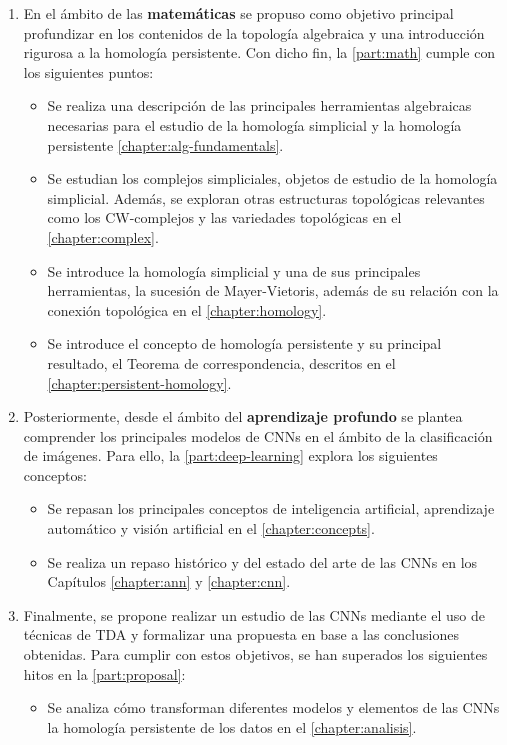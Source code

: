 \begin{enumerate}
	\item En el ámbito de las \textbf{matemáticas} se propuso como objetivo
	principal profundizar en los contenidos de la topología algebraica y una
	introducción rigurosa a la homología persistente. Con dicho fin, la
	\autoref{part:math} cumple con los siguientes puntos:
	\begin{itemize}
		\item Se realiza una descripción de las principales herramientas algebraicas
		necesarias para el estudio de la homología simplicial y la homología persistente
		\autoref{chapter:alg-fundamentals}.
		
		\item Se estudian los complejos simpliciales, objetos de estudio de la
		homología simplicial. Además, se exploran otras estructuras topológicas
		relevantes como los CW-complejos y las variedades topológicas en el
		\autoref{chapter:complex}.
		
		\item Se introduce la homología simplicial y una de sus principales herramientas,
		la sucesión de Mayer-Vietoris, además de su relación con la conexión topológica
		en el \autoref{chapter:homology}.
		
		\item Se introduce el concepto de homología persistente y su principal resultado,
		el Teorema de correspondencia, descritos en el \autoref{chapter:persistent-homology}.
	\end{itemize}
	
	\item Posteriormente, desde el ámbito del \textbf{aprendizaje profundo} se plantea
	comprender los principales modelos de CNNs en el ámbito de la clasificación de
	imágenes. Para ello, la \autoref{part:deep-learning} explora los siguientes conceptos:
	\begin{itemize}
		\item Se repasan los principales conceptos de inteligencia artificial,
		aprendizaje automático y visión artificial en el
		\autoref{chapter:concepts}.
		
		\item Se realiza un repaso histórico y del estado del arte de las CNNs en los
		Capítulos \ref{chapter:ann} y \ref{chapter:cnn}.
	\end{itemize}
	
	\item Finalmente, se propone realizar un estudio de las CNNs mediante el uso
	de técnicas de TDA y formalizar una propuesta en base a las conclusiones
	obtenidas. Para cumplir con estos objetivos, se han superados los siguientes
	hitos en la \autoref{part:proposal}:
	\begin{itemize}
		\item Se analiza cómo transforman diferentes modelos y elementos de las CNNs
		la homología persistente de los datos en el \autoref{chapter:analisis}.
		

\end{itemize}
\end{enumerate}
